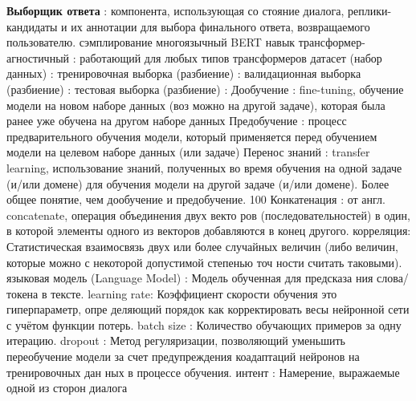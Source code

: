 \textbf{Выборщик ответа} : компонента, использующая со
стояние диалога, реплики-кандидаты и их аннотации для выбора финального
ответа, возвращаемого пользователю.
сэмплирование
многоязычный
BERT
навык
трансформер-агностичный : работающий для любых типов трансформеров
датасет (набор данных) :
тренировочная выборка (разбиение) :
валидационная выборка (разбиение) :
тестовая выборка (разбиение) :
Дообучение : fine-tuning, обучение модели на новом наборе данных (воз
можно на другой задаче), которая была ранее уже обучена на другом наборе
данных
Предобучение : процесс предварительного обучения модели, который
применяется перед обучением модели на целевом наборе данных (или задаче)
Перенос знаний : transfer learning, использование знаний, полученных во
время обучения на одной задаче (и/или домене) для обучения модели на другой
задаче (и/или домене). Более общее понятие, чем дообучение и предобучение.
100
Конкатенация : от англ. concatenate, операция объединения двух векто
ров (последовательностей) в один, в которой элементы одного из векторов добавляются в конец другого.
корреляция: Статистическая взаимосвязь двух или более случайных
величин (либо величин, которые можно с некоторой допустимой степенью точ
ности считать таковыми).
языковая модель (Language Model) : Модель обученная для предсказа
ния слова/токена в тексте.
learning rate: Коэффициент скорости обучения это гиперпараметр, опре
деляющий порядок как корректировать весы нейронной сети с учётом функции
потерь.
batch size : Количество обучающих примеров за одну итерацию.
dropout : Метод регуляризации, позволяющий уменьшить переобучение
модели за счет предупреждения коадаптаций нейронов на тренировочных дан
ных в процессе обучения.
интент : Намерение, выражаемые одной из сторон диалога
